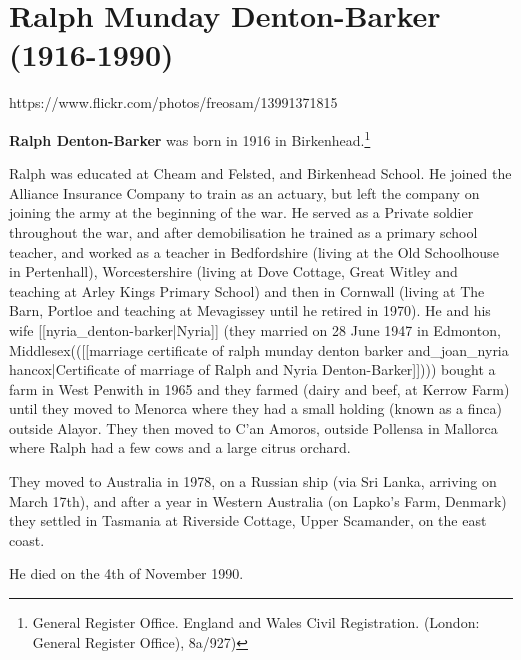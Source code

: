 \section{Ralph Munday Denton-Barker (1916-1990)}\label{Ralph_Munday_Denton-Barker}


https://www.flickr.com/photos/freosam/13991371815

\textbf{Ralph Denton-Barker} was born in 1916 in Birkenhead.\footnote{General Register Office. England and Wales Civil Registration. (London: General Register Office), 8a/927)}

Ralph was educated at Cheam and Felsted, and Birkenhead School. He joined the Alliance Insurance Company to train as an actuary, but left the company on joining the army at the beginning of the war. He served as a Private soldier throughout the war, and after demobilisation he trained as a primary school teacher, and worked as a teacher in Bedfordshire (living at the Old Schoolhouse in Pertenhall), Worcestershire (living at Dove Cottage, Great Witley and teaching at Arley Kings Primary School) and then in Cornwall (living at The Barn, Portloe and teaching at Mevagissey until he retired in 1970). He and his wife [[nyria_denton-barker|Nyria]] (they married on 28 June 1947 in Edmonton, Middlesex(([[marriage certificate of ralph munday denton barker and_joan_nyria hancox|Certificate of marriage of Ralph and Nyria Denton-Barker]]))) bought a farm in West Penwith in 1965 and they farmed (dairy and beef, at Kerrow Farm) until they moved to Menorca where they had a small holding (known as a finca) outside Alayor. They then moved to C'an Amoros, outside Pollensa in Mallorca where Ralph had a few cows and a large citrus orchard.

They moved to Australia in 1978, on a Russian ship (via Sri Lanka, arriving on March 17th), and after a year in Western Australia (on Lapko's Farm, Denmark) they settled in Tasmania at Riverside Cottage, Upper Scamander, on the east coast.

He died on the 4th of November 1990.
